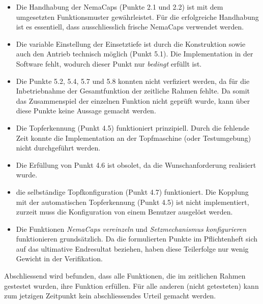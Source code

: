 \begin{itemize}

	\item Die Handhabung der NemaCaps (Punkte 2.1 und 2.2) ist mit dem umgesetzten Funktionsmuster gewährleistet. Für die erfolgreiche Handhabung ist es essentiell, dass ausschliesslich frische NemaCaps verwendet werden. 
	
	\item Die variable Einstellung der Einsetztiefe ist durch die Konstruktion sowie auch den Antrieb technisch möglich (Punkt 5.1). Die Implementation in der Software fehlt, wodurch dieser Punkt nur \textit{bedingt} erfüllt ist.
	
	\item Die Punkte 5.2, 5.4, 5.7 und 5.8 konnten nicht verfiziert werden, da für die Inbetriebnahme der Gesamtfunktion der zeitliche Rahmen fehlte. Da somit das Zusammenspiel der einzelnen Funktion nicht geprüft wurde, kann über diese Punkte keine Aussage gemacht werden.
	
	\item Die Topferkennung (Punkt 4.5) funktioniert prinzipiell. Durch die fehlende Zeit konnte die Implementation an der Topfmaschine (oder Testumgebung) nicht durchgeführt werden.
	
	\item Die Erfüllung von Punkt 4.6 ist obsolet, da die Wunschanforderung realisiert wurde.
	
	\item die selbständige Topfkonfiguration (Punkt 4.7) funktioniert. Die Kopplung mit der automatischen Topferkennung (Punkt 4.5) ist nicht implementiert, zurzeit muss die Konfiguration von einem Benutzer ausgelöst werden.
	
	\item Die Funktionen \textit{NemaCaps vereinzeln} und \textit{Setzmechanismus konfigurieren} funktionieren grundsätzlich. Da die formulierten Punkte im Pflichtenheft sich auf das ultimative Endresultat beziehen, haben diese Teilerfolge nur wenig Gewicht in der Verifikation.
\end{itemize}

Abschliessend wird befunden, dass alle Funktionen, die im zeitlichen Rahmen gestestet wurden, ihre Funktion erfüllen. Für alle anderen (nicht getesteten) kann zum jetzigen Zeitpunkt kein abschliessendes Urteil gemacht werden.